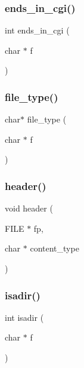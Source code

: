\subsubsection{\texorpdfstring{ends\_in\_cgi()}{ends\_in\_cgi()}}
{\footnotesize\ttfamily int ends\+\_\+in\+\_\+cgi (\begin{DoxyParamCaption}\item[{char $\ast$}]{f }\end{DoxyParamCaption})}

\mbox{\label{10d-serwer_8c_a29b9ee72561809560e62a9ea307d1ff6}} 
\subsubsection{\texorpdfstring{file\_type()}{file\_type()}}
{\footnotesize\ttfamily char$\ast$ file\+\_\+type (\begin{DoxyParamCaption}\item[{char $\ast$}]{f }\end{DoxyParamCaption})}

\mbox{\label{10d-serwer_8c_adc7bfb1c892aecf61c0c73f3458caf90}} 
\subsubsection{\texorpdfstring{header()}{header()}}
{\footnotesize\ttfamily void header (\begin{DoxyParamCaption}\item[{F\+I\+LE $\ast$}]{fp,  }\item[{char $\ast$}]{content\+\_\+type }\end{DoxyParamCaption})}

\mbox{\label{10d-serwer_8c_a68ac50fc5196973b9f3ef7b4992f7279}} 
\subsubsection{\texorpdfstring{isadir()}{isadir()}}
{\footnotesize\ttfamily int isadir (\begin{DoxyParamCaption}\item[{char $\ast$}]{f }\end{DoxyParamCaption})}

